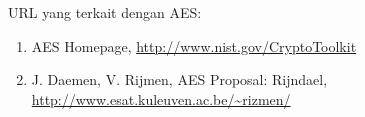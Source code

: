 \documentclass{article}
\begin{document}

URL yang terkait dengan AES:
\begin{enumerate}
    \item AES Homepage, \url{http://www.nist.gov/CryptoToolkit}
    \item J. Daemen, V. Rijmen, AES Proposal: Rijndael, \url{http://www.esat.kuleuven.ac.be/~rizmen/}
\end{enumerate}
\end{document}

